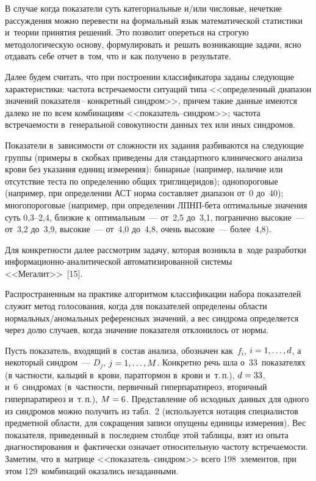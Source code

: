 \begin{multicols}{2}
     В случае когда показатели суть категориальные и/или числовые, 
нечеткие рассуждения можно перевести на формальный язык математической 
статистики и~теории принятия решений. Это позволит опереться на строгую 
методологическую основу, формулировать и~решать возникающие задачи, ясно 
отдавать себе отчет в~том, что и~как получено в~результате.
     
     Далее будем считать, что при построении классификатора заданы 
следующие характеристики: час\-то\-та встречаемости ситуаций типа 
<<определенный диапазон значений по\-ка\-за\-те\-ля\,--\,кон\-крет\-ный синдром>>, 
причем такие данные имеются далеко не по всем комбинациям  
<<по\-ка\-за\-тель--синд\-ром>>; частота встречаемости в~генеральной 
совокупности данных тех или иных синдромов.
     
     Показатели в~зависимости от сложности их задания разбиваются на 
следующие группы (примеры в~скобках приведены для стандартного 
клинического анализа крови без указания единиц измерения): бинарные 
(например, наличие или отсутствие теста по определению общих 
триглицеридов); однопороговые (например, при определении АСТ норма 
составляет диапазон от~0 до~40); многопороговые (например, при определении 
ЛПНП-бета оптимальные значения суть 0,3--2,4, близкие к~оптимальным~--- 
от~2,5 до~3,1, погранично высокие~--- от~3,2 до~3,9, высокие~--- от~4,0 
до~4,8, очень высокие~--- более~4,8).
     
     Для конкретности далее рассмотрим задачу, которая возникла в~ходе 
разработки информа\-ци\-он\-но-ана\-ли\-ти\-че\-ской автоматизированной системы 
<<Мегалит>>~[15].
     
     Распространенным на практике алгоритмом классификации набора 
показателей служит метод голосования, когда для показателей определены 
области нор\-маль\-ных/ано\-маль\-ных референсных значений, а вес синдрома 
определяется через долю случаев, когда значение показателя отклонилось от 
нормы.
     
     Пусть показатель, входящий в~состав анализа, обозначен как~$f_i$, 
$i\hm=1,\ldots , d$, а некоторый синдром~--- $D_j$, $j\hm=1,\ldots , M$. 
Конкретно речь шла о~33~показателях (в частности, кальций в~крови, 
паратгормон в~крови и~т.\,п.), $d\hm=33$, и~6~синдромах (в~част\-ности, 
первичный гиперпаратиреоз, вторичный гиперпаратиреоз и~т.\,п.), $M\hm=6$. 
Представление об исходных данных для одного из синдромов можно получить 
из табл.~2 (используется нотация специалистов предметной области, для 
сокращения записи опущены единицы измерения). Вес показателя, 
приведенный в~последнем столбце этой таблицы, взят из опыта 
диагностирования и~фактически означает относительную частоту 
встречаемости. Заметим, что в~матрице <<по\-ка\-за\-тель--синд\-ром>> всего 
198~элементов, при этом 129~комбинаций оказались незаданными.
     


\end{multicols}
